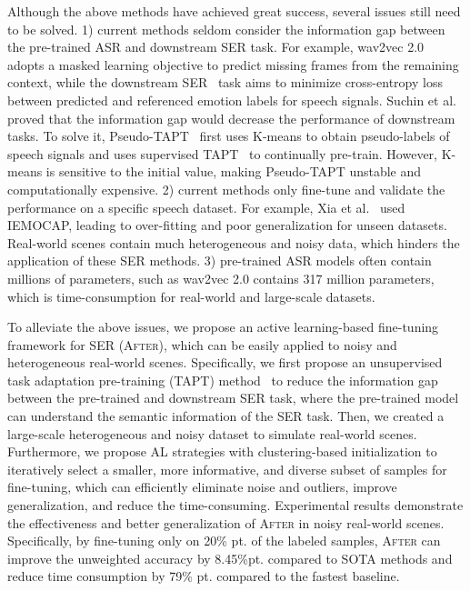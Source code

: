 \documentclass{article}
\begin{document}
Although the above methods have achieved great success, several issues still need to be solved. 1) current methods seldom consider the information gap between the pre-trained ASR and downstream SER task. For example, wav2vec 2.0~\cite{baevski2020wav2vec} adopts a masked learning objective to predict missing frames from the remaining context, while the downstream SER~\cite{Aftab, BaruahB22} task aims to minimize cross-entropy loss between predicted and referenced emotion labels for speech signals.
%
Suchin et al.~\cite{gururangan-etal-2020-dont} proved that the information gap would decrease the performance of downstream tasks.
%
To solve it, Pseudo-TAPT~\cite{2110-06309} first uses K-means to obtain pseudo-labels of speech signals and uses supervised TAPT~\cite{gururangan-etal-2020-dont} to continually pre-train.
However, K-means is sensitive to the initial value, making Pseudo-TAPT unstable and computationally expensive.
%
2) current methods only fine-tune and validate the performance on a specific speech dataset. For example, Xia et al.~\cite{XiaCRS21} used IEMOCAP, leading to over-fitting and poor generalization for unseen datasets. Real-world scenes contain much heterogeneous and noisy data, which hinders the application of these SER methods.
%
3) pre-trained ASR models often contain millions of parameters, such as wav2vec 2.0 contains 317 million parameters, which is time-consumption for real-world and large-scale datasets.



To alleviate the above issues, we propose an active learning-based fine-tuning framework for SER (\textsc{After}), which can be easily applied to noisy and heterogeneous real-world scenes.
%
Specifically,  we first propose an unsupervised task adaptation pre-training (TAPT) method~\cite{gururangan-etal-2020-dont} to reduce the information gap between the pre-trained and downstream SER task, where the pre-trained model can understand the semantic information of the SER task. 
%
Then, we created a large-scale heterogeneous and noisy dataset to simulate real-world scenes. Furthermore, we propose AL strategies with clustering-based initialization to iteratively select a smaller, more informative, and diverse subset of samples for fine-tuning, which can efficiently eliminate noise and outliers, improve generalization, and reduce the time-consuming.
%
Experimental results demonstrate the effectiveness and better generalization of \textsc{After} in noisy real-world scenes. Specifically, by fine-tuning only on 20\% pt. of the labeled samples, \textsc{After} can improve the unweighted accuracy by 8.45\%pt. compared to SOTA methods and reduce time consumption by 79\% pt. compared to the fastest baseline.
\end{document}

